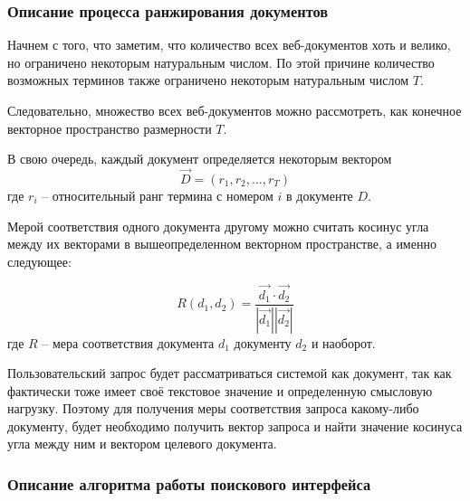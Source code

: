 \subsubsection{Описание процесса ранжирования документов}

Начнем с того, что заметим, что количество всех веб-документов хоть и велико, но ограничено некоторым натуральным числом. По этой причине количество возможных терминов также ограничено некоторым натуральным числом $T$. 

Следовательно, множество всех веб-документов можно рассмотреть, как конечное векторное пространство размерности $T$. 

В свою очередь, каждый документ определяется некоторым вектором
\begin{equation}
\vec{D}=(r_1, r_2, ..., r_T)
\end{equation} где $r_i$ -- относительный ранг термина с номером $i$ в документе $D$.

Мерой соответствия одного документа другому можно считать косинус угла между их векторами в вышеопределенном векторном пространстве, а именно следующее:

\begin{equation}
R(d_1, d_2)=\frac{\vec{d_1} \cdot \vec{d_2}}{|\vec{d_1}| |\vec{d_2}|}
\end{equation} где $R$ -- мера соответствия документа $d_1$ документу $d_2$ и наоборот.

Пользовательский запрос будет рассматриваться системой как документ, так как фактически тоже имеет своё текстовое значение и определенную смысловую нагрузку. Поэтому для получения меры соответствия запроса какому-либо документу, будет необходимо получить вектор запроса и найти значение косинуса угла между ним и вектором целевого документа.

\subsubsection{Описание алгоритма работы поискового интерфейса}

